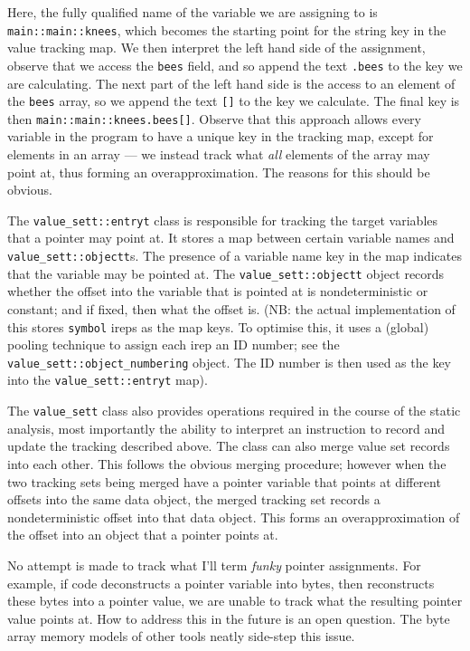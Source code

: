 \documentclass{article}
\begin{document}
Here, the fully qualified name of the variable we are assigning to is
\texttt{main::main::knees}, which becomes the starting point for the string
key in the value tracking map. We then interpret the left hand side of the
assignment, observe that we access the \texttt{bees} field, and so append the
text \texttt{.bees} to the key we are calculating. The next part of the left
hand side is the access to an element of the \texttt{bees} array, so we
append the text \texttt{[]} to the key we calculate. The final key is then
\texttt{main::main::knees.bees[]}. Observe that this approach allows every
variable in the program to have a unique key in the tracking map, except for
elements in an array --- we instead track what \textit{all} elements of the
array may point at, thus forming an overapproximation. The reasons for this
should be obvious.

The \texttt{value\_sett::entryt} class is responsible for tracking the target
variables that a pointer may point at. It stores a map between certain variable
names and \texttt{value\_sett::objectt}s. The presence of a variable name key
in the map indicates that the variable may be pointed at. The
\texttt{value\_sett::objectt} object records whether the offset into the
variable that is pointed at is nondeterministic or constant; and if fixed,
then what the offset is. (NB: the actual implementation of this stores
\texttt{symbol} ireps as the map keys. To optimise this, it uses a (global)
pooling technique to assign each irep an ID number; see the
\texttt{value\_sett::object\_numbering} object. The ID number is then used
as the key into the \texttt{value\_sett::entryt} map).

The \texttt{value\_sett} class also provides operations required in the course
of the static analysis, most importantly the ability to interpret an instruction
to record and update the tracking described above. The class can also merge
value set records into each other. This follows the obvious merging procedure;
however when the two tracking sets being merged have a pointer variable
that points at different offsets into the same data object, the merged
tracking set records a nondeterministic offset into that data object. This
forms an overapproximation of the offset into an object that a pointer points
at.

No attempt is made to track what I'll term \textit{funky} pointer assignments.
For example, if code deconstructs a pointer variable into bytes, then
reconstructs these bytes into a pointer value, we are unable to track
what the resulting pointer value points at. How to address this in the future
is an open question. The byte array memory models of other tools neatly
side-step this issue.
\end{document}
